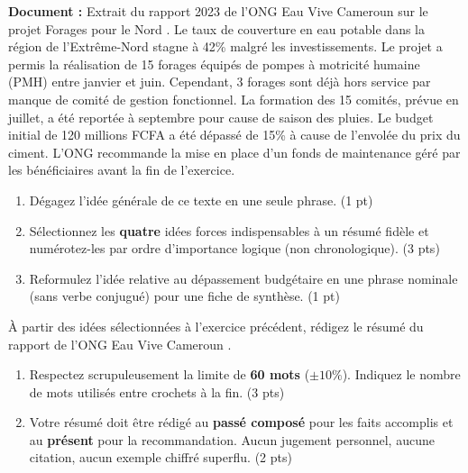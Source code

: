 \documentclass[11pt]{article}
\begin{document}
\begin{exercice}
\textbf{Document :} Extrait du rapport 2023 de l'ONG \og Eau Vive Cameroun \fg{} sur le projet \og Forages pour le Nord \fg.
\og Le taux de couverture en eau potable dans la région de l'Extrême-Nord stagne à 42\% malgré les investissements. Le projet a permis la réalisation de 15 forages équipés de pompes à motricité humaine (PMH) entre janvier et juin. Cependant, 3 forages sont déjà hors service par manque de comité de gestion fonctionnel. La formation des 15 comités, prévue en juillet, a été reportée à septembre pour cause de saison des pluies. Le budget initial de 120 millions FCFA a été dépassé de 15\% à cause de l'envolée du prix du ciment. L'ONG recommande la mise en place d'un fonds de maintenance géré par les bénéficiaires avant la fin de l'exercice. \fg

\begin{enumerate}
    \item Dégagez l'idée générale de ce texte en une seule phrase. (1 pt)
    \item Sélectionnez les \textbf{quatre} idées forces indispensables à un résumé fidèle et numérotez-les par ordre d'importance logique (non chronologique). (3 pts)
    \item Reformulez l'idée relative au dépassement budgétaire en une phrase nominale (sans verbe conjugué) pour une fiche de synthèse. (1 pt)
\end{enumerate}
\end{exercice}

\begin{exercice}
À partir des idées sélectionnées à l'exercice précédent, rédigez le résumé du rapport de l'ONG \og Eau Vive Cameroun \fg.

\begin{enumerate}
    \item Respectez scrupuleusement la limite de \textbf{60 mots} ($\pm 10\%$). Indiquez le nombre de mots utilisés entre crochets à la fin. (3 pts)
    \item Votre résumé doit être rédigé au \textbf{passé composé} pour les faits accomplis et au \textbf{présent} pour la recommandation. Aucun jugement personnel, aucune citation, aucun exemple chiffré superflu. (2 pts)
\end{enumerate}
\end{exercice}
\end{document}
